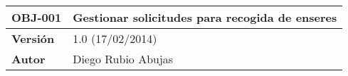 \begin{table}[H]
\centering
\begin{tabular}{|l|l|}
\hline
\multicolumn{1}{|c|}{\textbf{OBJ-001}} & \textbf{Gestionar solicitudes para recogida de enseres}                                                                                                                                                                                                                                                                                                                                                                                                                                                                                                                                                                                                                                                                                                                                                                        \\ \hline
\textbf{Versión}                       & 1.0 (17/02/2014)                                                                                                                                                                                                                                                                                                                                                                                                                                                                                                                                                                                                                                                                                                                                                                                                         \\ \hline
\textbf{Autor}                         & Diego Rubio Abujas                                                                                                                                                                                                                                                                                                                                                                                                                                                                                                                                                                                                                                                                                                                                                                                                       \\ \hline

\end{tabular}
\end{table}
